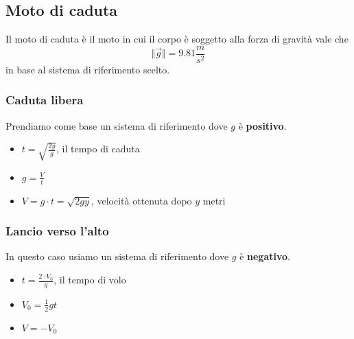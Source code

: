 \documentclass[../main.tex]{subfiles}
\begin{document}
\subsection{Moto di caduta}
Il moto di caduta è il moto in cui il corpo è soggetto alla forza di gravità vale che
$$
    \Vert \vec{g} \Vert = 9.81 \frac{m}{s^2}
$$
in base al sistema di riferimento scelto.

\subsubsection{Caduta libera}
Prendiamo come base un sistema di riferimento dove $g$ è \textbf{positivo}.
\begin{itemize}
    \item $t = \sqrt{\frac{2y}{g}}$, il tempo di caduta
    \item $g = \frac{V}{t}$
    \item $V = g \cdot t = \sqrt{2 g y}$, velocità ottenuta dopo $y$ metri
\end{itemize}

\subsubsection{Lancio verso l'alto}
In questo caso usiamo un sistema di riferimento dove $g$ è \textbf{negativo}.
\begin{itemize}
    \item $t = \frac{2 \cdot V_0}{g}$, il tempo di volo
    \item $V_0 = \frac{1}{2}gt$
    \item $V = -V_0$
\end{itemize}
\end{document}
